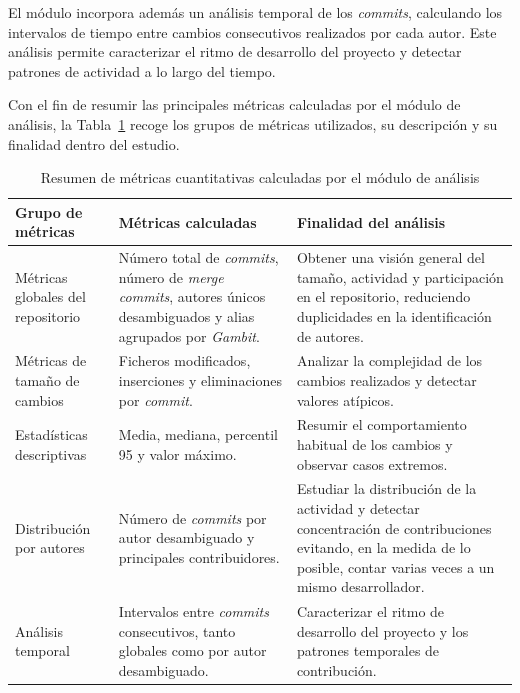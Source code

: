 \documentclass[a4paper, 12pt]{book}
\begin{document}
El módulo incorpora además un análisis temporal de los \emph{commits}, calculando los intervalos de tiempo entre cambios consecutivos realizados por cada autor. Este análisis permite caracterizar el ritmo de desarrollo del proyecto y detectar patrones de actividad a lo largo del tiempo.

Con el fin de resumir las principales métricas calculadas por el módulo de análisis, la Tabla~\ref{tab:metricas_cuantitativas} recoge los grupos de métricas utilizados, su descripción y su finalidad dentro del estudio.

\begin{table}[H]
\centering
\small
\begin{tabular}{|p{3.5cm}|p{5.2cm}|p{5.2cm}|}
\hline
\textbf{Grupo de métricas} & \textbf{Métricas calculadas} & \textbf{Finalidad del análisis} \\
\hline

Métricas globales del repositorio &
Número total de \emph{commits}, número de \emph{merge commits}, autores únicos desambiguados y alias agrupados por \emph{Gambit}. &
Obtener una visión general del tamaño, actividad y participación en el repositorio, reduciendo duplicidades en la identificación de autores. \\
\hline

Métricas de tamaño de cambios &
Ficheros modificados, inserciones y eliminaciones por \emph{commit}. &
Analizar la complejidad de los cambios realizados y detectar valores atípicos. \\
\hline

Estadísticas descriptivas &
Media, mediana, percentil 95 y valor máximo. &
Resumir el comportamiento habitual de los cambios y observar casos extremos. \\
\hline

Distribución por autores &
Número de \emph{commits} por autor desambiguado y principales contribuidores. &
Estudiar la distribución de la actividad y detectar concentración de contribuciones evitando, en la medida de lo posible, contar varias veces a un mismo desarrollador. \\
\hline

Análisis temporal &
Intervalos entre \emph{commits} consecutivos, tanto globales como por autor desambiguado. &
Caracterizar el ritmo de desarrollo del proyecto y los patrones temporales de contribución. \\
\hline

\end{tabular}
\caption{Resumen de métricas cuantitativas calculadas por el módulo de análisis}
\label{tab:metricas_cuantitativas}
\end{table}
\end{document}
